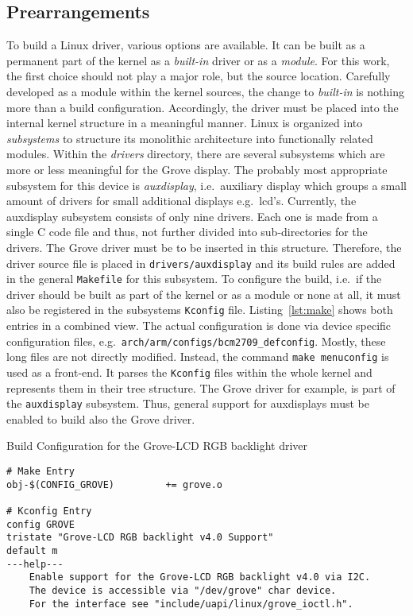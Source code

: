   \subsection{Prearrangements}\label{sec:linux:prearrangements}
To build a Linux driver, various options are available.
It can be built as a permanent part of the kernel as a \textit{built-in} driver or as a \textit{module}.
For this work, the first choice should not play a major role, but the source location.
Carefully developed as a module within the kernel sources, the change to \textit{built-in} is nothing more than a build configuration.
Accordingly, the driver must be placed into the internal kernel structure in a meaningful manner.
Linux is organized into \textit{subsystems} to structure its monolithic architecture into functionally related modules.
Within the \textit{drivers} directory, there are several subsystems which are more or less meaningful for the Grove display.
The probably most appropriate subsystem for this device is \textit{auxdisplay}, i.e.\ auxiliary display which groups a small amount of drivers for small additional displays e.g.\ \ac{lcd}'s.
Currently, the auxdisplay subsystem consists of only nine drivers.
Each one is made from a single C code file and thus, not further divided into sub-directories for the drivers.
The Grove driver must be to be inserted in this structure.
Therefore, the driver source file is placed in \texttt{drivers/auxdisplay} and its build rules are added in the general \texttt{Makefile} for this subsystem.
To configure the build, i.e.\ if the driver should be built as part of the kernel or as a module or none at all, it must also be registered in the subsystems \texttt{Kconfig} file.
Listing~\ref{lst:make} shows both entries in a combined view.
The actual configuration is done via device specific configuration files, e.g.\ \texttt{arch/arm/configs/bcm2709_defconfig}.
Mostly, these long files are not directly modified.
Instead, the command \texttt{make menuconfig} is used as a front-end.
It parses the \texttt{Kconfig} files within the whole kernel and represents them in their tree structure.
The Grove driver for example, is part of the \texttt{auxdisplay} subsystem.
Thus, general support for auxdisplays must be enabled to build also the Grove driver.
%
\begin{listing} [ht]
\caption{Build Configuration for the Grove-LCD RGB backlight driver}
\label{lst:make}
\begin{verbatim}
# Make Entry
obj-$(CONFIG_GROVE)			+= grove.o

# Kconfig Entry
config GROVE
tristate "Grove-LCD RGB backlight v4.0 Support"
default m
---help---
    Enable support for the Grove-LCD RGB backlight v4.0 via I2C.
    The device is accessible via "/dev/grove" char device.
    For the interface see "include/uapi/linux/grove_ioctl.h".
\end{verbatim}
\end{listing}

